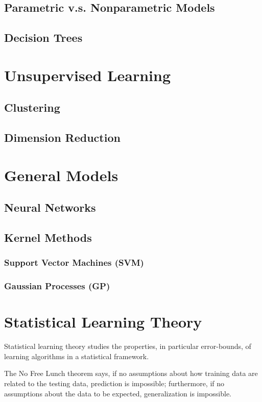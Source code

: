 \documentclass{book}
\begin{document}
\chapter{Parametric v.s. Nonparametric Models}
\chapter{Decision Trees}

\part{Unsupervised Learning}
\chapter{Clustering}
\chapter{Dimension Reduction}






\part{General Models}

\chapter{Neural Networks}
\chapter{Kernel Methods}
\section{Support Vector Machines (SVM)}
\section{Gaussian Processes (GP)}

\part{Statistical Learning Theory}
Statistical learning theory studies the properties, in particular error-bounds, of learning algorithms in a statistical framework.

The No Free Lunch theorem says, if no assumptions about how training data are related to the testing data, prediction is impossible; furthermore, if no assumptions about the data to be expected, generalization is impossible.
\end{document}
